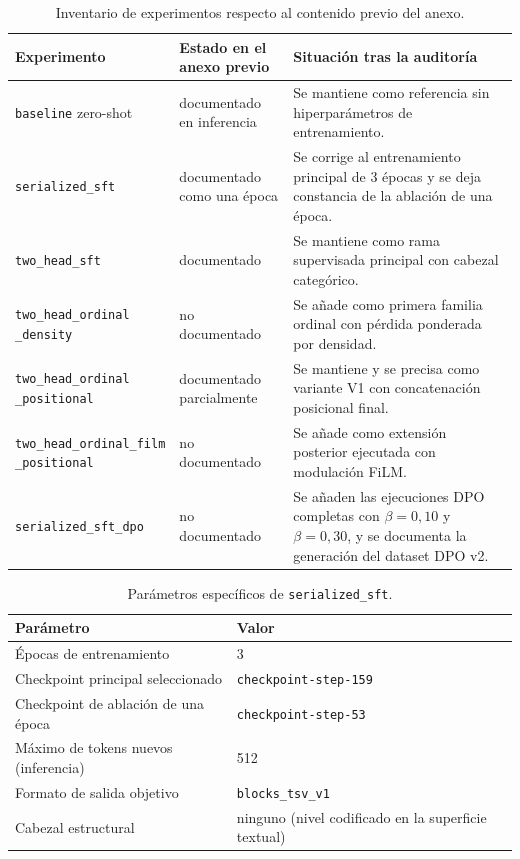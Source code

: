 \begin{table}[htbp]
\centering
\small
\caption{Inventario de experimentos respecto al contenido previo del anexo.}
\label{tab:AnexoA_inventory}
\begin{tabularx}{\textwidth}{p{}p{}X}
\toprule
\textbf{Experimento} & \textbf{Estado en el anexo previo} & \textbf{Situación tras la auditoría} \\
\midrule
\texttt{baseline} zero-shot & documentado en inferencia & Se mantiene como referencia sin hiperparámetros de entrenamiento. \\
\texttt{serialized\_sft} & documentado como una época & Se corrige al entrenamiento principal de 3 épocas y se deja constancia de la ablación de una época. \\
\texttt{two\_head\_sft} & documentado & Se mantiene como rama supervisada principal con cabezal categórico. \\
\shortstack[l]{\texttt{two\_head\_ordinal}\\\texttt{\_density}} & no documentado & Se añade como primera familia ordinal con pérdida ponderada por densidad. \\
\shortstack[l]{\texttt{two\_head\_ordinal}\\\texttt{\_positional}} & documentado parcialmente & Se mantiene y se precisa como variante V1 con concatenación posicional final. \\
\shortstack[l]{\texttt{two\_head\_ordinal\_film}\\\texttt{\_positional}} & no documentado & Se añade como extensión posterior ejecutada con modulación FiLM. \\
\texttt{serialized\_sft\_dpo} & no documentado & Se añaden las ejecuciones DPO completas con \(\beta=0{,}10\) y \(\beta=0{,}30\), y se documenta la generación del dataset DPO v2. \\
\bottomrule
\end{tabularx}
\end{table}

\begin{table}[htbp]
\centering
\caption{Parámetros específicos de \texttt{serialized\_sft}.}
\label{tab:AnexoA_sft}
\begin{tabularx}{\textwidth}{p{}X}
\toprule
\textbf{Parámetro} & \textbf{Valor} \\
\midrule
Épocas de entrenamiento & 3 \\
Checkpoint principal seleccionado & \texttt{checkpoint-step-159} \\
Checkpoint de ablación de una época & \texttt{checkpoint-step-53} \\
Máximo de tokens nuevos (inferencia) & 512 \\
Formato de salida objetivo & \texttt{blocks\_tsv\_v1} \\
Cabezal estructural & ninguno (nivel codificado en la superficie textual) \\
\bottomrule
\end{tabularx}
\end{table}

